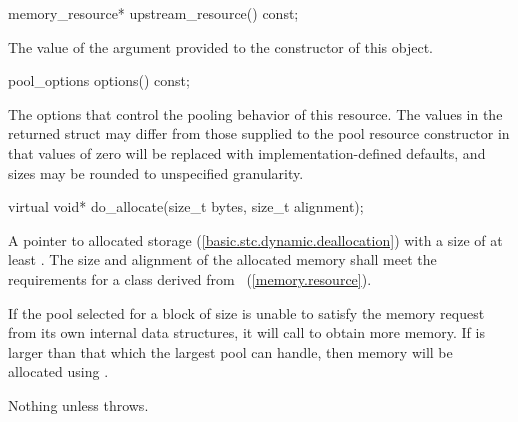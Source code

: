 %
%
%
%
\begin{itemdecl}
memory_resource* upstream_resource() const;
\end{itemdecl}

\begin{itemdescr}
\pnum
\returns
The value of the  argument
provided to the constructor of this object.
\end{itemdescr}

%
%
%
%
\begin{itemdecl}
pool_options options() const;
\end{itemdecl}

\begin{itemdescr}
\pnum
\returns
The options that control the pooling behavior of this resource.
The values in the returned struct may differ
from those supplied to the pool resource constructor in that
values of zero will be replaced with implementation-defined defaults,
and sizes may be rounded to unspecified granularity.
\end{itemdescr}

%
%
%
%
\begin{itemdecl}
virtual void* do_allocate(size_t bytes, size_t alignment);
\end{itemdecl}

\begin{itemdescr}
\pnum
\returns
A pointer to allocated storage (\ref{basic.stc.dynamic.deallocation})
with a size of at least .
The size and alignment of the allocated memory shall meet the requirements
for a class derived from ~(\ref{memory.resource}).

\pnum
\effects
If the pool selected for a block of size 
is unable to satisfy the memory request from its own internal data structures,
it will call  to obtain more memory.
If  is larger than that which the largest pool can handle,
then memory will be allocated using .

\pnum
\throws
Nothing unless  throws.
\end{itemdescr}

